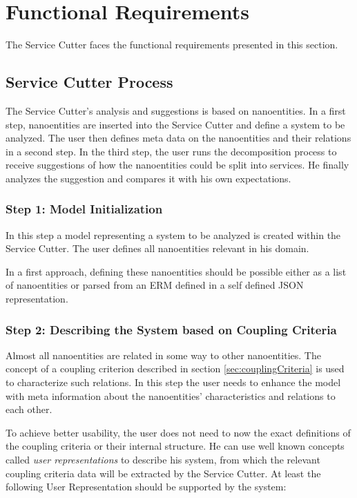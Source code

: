 \section{Functional Requirements}

The Service Cutter faces the functional requirements presented in this
section.


\subsection{Service Cutter Process}

The Service Cutter's analysis and suggestions is based on nanoentities. In a first step, nanoentities are inserted into the Service Cutter and define a system to be analyzed. The user then defines meta data on the nanoentities and their relations in a second step. In the third step, the user runs the decomposition process to receive suggestions of how the nanoentities could be split into services. He finally analyzes the suggestion and compares it with his own expectations. 

\subsubsection{Step 1: Model Initialization}

In this step a model representing a system to be analyzed is created within the Service Cutter. The user defines all nanoentities relevant in his domain. 

In a first approach, defining these nanoentities should be possible either as a list of nanoentities or parsed from an \gls{ERM} defined in a self defined JSON representation.

\subsubsection{Step 2: Describing the System based on Coupling Criteria}

Almost all nanoentities are related in some way to other nanoentities. The concept of a coupling criterion described in section \ref{sec:couplingCriteria} is used to characterize such relations. In this step the user needs to enhance the model with meta information about the nanoentities' characteristics and relations to each other. 

To achieve better usability, the user does not need to now the exact definitions of the coupling criteria or their internal structure. He can use well known concepts called \textit{user representations} to describe his system, from which the relevant coupling criteria data will be extracted by the Service Cutter. At least the following User Representation should be supported by the system:


